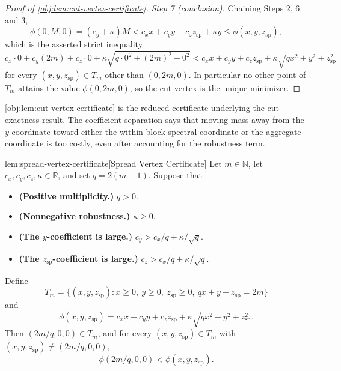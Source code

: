 \documentclass[11pt]{article}
\begin{document}
\begin{proof}[Proof of \cref{obj:lem:cut-vertex-certificate}]
\emph{Step 7 (conclusion).}  Chaining Steps 2, 6 and 3,
\[
\phi(0,M,0)=(c_y+\kappa)M
<c_xx+c_yy+c_zz_{\mathrm{sp}}+\kappa y
\le\phi(x,y,z_{\mathrm{sp}}),
\]
which is the asserted strict inequality
\[
c_x\cdot0+c_y(2m)+c_z\cdot0+\kappa\sqrt{q\cdot0^2+(2m)^2+0^2}
<c_xx+c_yy+c_zz_{\mathrm{sp}}+\kappa\sqrt{qx^2+y^2+z_{\mathrm{sp}}^2}
\]
for every \((x,y,z_{\mathrm{sp}})\in T_m\) other than \((0,2m,0)\).  In particular no other point of \(T_m\) attains the value \(\phi(0,2m,0)\), so the cut vertex is the unique minimizer. %
\end{proof}

\cref{obj:lem:cut-vertex-certificate} is the reduced certificate underlying the cut exactness result. The coefficient separation says that moving mass away from the \(y\)-coordinate toward either the within-block spectral coordinate or the aggregate coordinate is too costly, even after accounting for the robustness term.

\begin{lemmav}{lem:spread-vertex-certificate}[Spread Vertex Certificate]
Let \(m\in\mathbb N\), let \(c_x,c_y,c_z,\kappa\in\mathbb R\), and set \(q=2(m-1)\). Suppose that
\begin{itemize}
\item \textbf{(Positive multiplicity.)} \(q>0\).
\item \textbf{(Nonnegative robustness.)} \(\kappa\ge 0\).
\item \textbf{(The \(y\)-coefficient is large.)} \(c_y>c_x/q+\kappa/\sqrt q\).
\item \textbf{(The \(z_{\mathrm{sp}}\)-coefficient is large.)} \(c_z>c_x/q+\kappa/\sqrt q\).
\end{itemize}
Define
\[
T_m=\{(x,y,z_{\mathrm{sp}}):x\ge0,\ y\ge0,\ z_{\mathrm{sp}}\ge0,\ qx+y+z_{\mathrm{sp}}=2m\}
\]
and
\[
\phi(x,y,z_{\mathrm{sp}})
=
c_xx+c_yy+c_zz_{\mathrm{sp}}
+\kappa\sqrt{qx^2+y^2+z_{\mathrm{sp}}^2}.
\]
Then \((2m/q,0,0)\in T_m\), and for every \((x,y,z_{\mathrm{sp}})\in T_m\) with
\((x,y,z_{\mathrm{sp}})\neq (2m/q,0,0)\),
\[
\phi(2m/q,0,0)<\phi(x,y,z_{\mathrm{sp}}).
\]
\end{lemmav}
\end{document}
